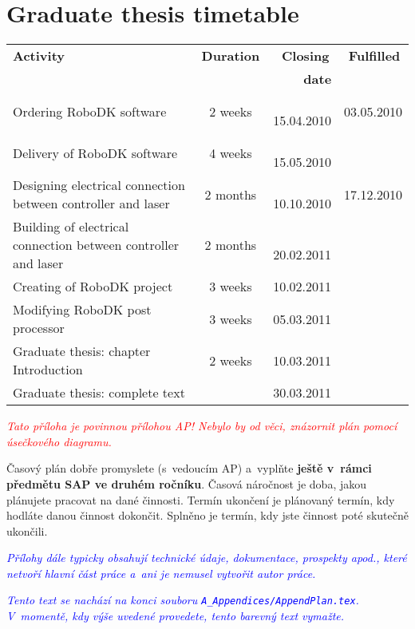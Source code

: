 ﻿\chapter{Graduate thesis timetable \label{ch:ApendPLAN}}


\begin{center}
\begin{tabular}{|p{8cm}|c|r|r|}
  \hline
  \textbf{\hspace{3.3cm} Activity} & \textbf{Duration} & \textbf{Closing\,} & \textbf{Fulfilled\,} \\
  {} & \textbf{} & \textbf{date} & {} \\
  \hline

  {Ordering RoboDK software}
                & {2 weeks} & \,{15.04.2010} & {03.05.2010} \\\hline
  {Delivery of RoboDK software}
                & {4 weeks} & \,{15.05.2010} & {} \\\hline
  {Designing electrical connection between controller and laser}
                & {2 months} & \,{10.10.2010} & {17.12.2010} \\\hline
  {Building of electrical connection between controller and laser}
                & {2 months} & \,{20.02.2011} & {} \\\hline
  {Creating of RoboDK project}
                & {3 weeks} & {10.02.2011} & {} \\\hline
  {Modifying RoboDK post processor}
                & {3 weeks} & {05.03.2011} & {} \\\hline
  {Graduate thesis: chapter Introduction}
                & {2 weeks} & {10.03.2011} & {} \\\hline
  {Graduate thesis: complete text}
                & {} & {30.03.2011} & {} \\\hline
\end{tabular}
\end{center}





\textcolor{red}{\em Tato příloha je povinnou přílohou AP! Nebylo by od věci, znázornit plán pomocí úsečkového diagramu.\/}

Časový plán dobře promyslete (s~vedoucím AP) a~vyplňte \textbf{ještě v~rámci předmětu SAP ve druhém ročníku}. Časová náročnost je doba, jakou plánujete pracovat na dané činnosti. Termín ukončení je plánovaný termín, kdy hodláte danou činnost dokončit. Splněno je termín, kdy jste činnost poté skutečně ukončili.

\textcolor{blue}{\em Přílohy dále typicky obsahují technické údaje, dokumentace, prospekty apod., kte\-ré netvoří hlavní část práce a~ani je nemusel vytvořit autor práce.\/}

\textcolor{blue}{\em Tento text se nachází na konci souboru \texttt{A\_Appendices/AppendPlan.tex}. V~momentě, kdy výše uvedené provedete, tento barevný text vymažte.\/} 
